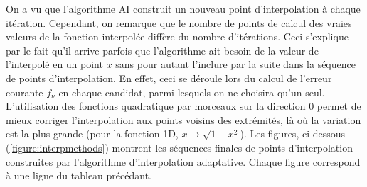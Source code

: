 \hspace{0.5cm} On a vu que l'algorithme AI construit un nouveau point d'interpolation à chaque itération. Cependant, on remarque que le nombre de points de calcul des vraies valeurs de la fonction interpolée diffère du nombre d'itérations. Ceci s'explique par le fait qu'il arrive parfois que l'algorithme ait besoin de la valeur de l'interpolé en un point $x$ sans pour autant l'inclure par la suite dans la séquence de points d'interpolation. En effet, ceci se déroule lors du calcul de l'erreur courante $f_{\nu}$ en chaque candidat, parmi lesquels on ne choisira qu'un seul. \\
L'utilisation des fonctions quadratique par morceaux sur la direction $0$ permet de mieux corriger l'interpolation aux points voisins des extrémités, là où la variation est la plus grande (pour la fonction 1D, $x \mapsto \sqrt{1-x^2}$). Les figures, ci-dessous (\ref{figure:interpmethods}) montrent les séquences finales de points d'interpolation construites par l'algorithme d'interpolation adaptative. Chaque figure correspond à une ligne du tableau précédant.
